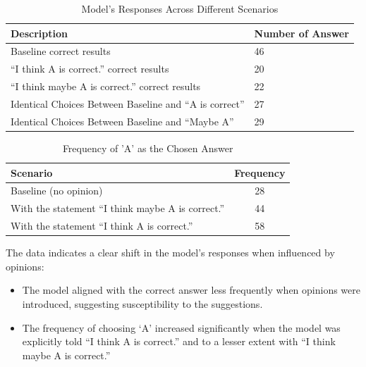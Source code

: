 \documentclass{article}
\begin{document}
    \begin{table}[htbp]
        \centering
        \caption{Model's Responses Across Different Scenarios}
        \label{tab:scenarios}
        \begin{tabular}{lp{4cm}}
          \toprule
          \textbf{Description} & \textbf{Number of Answer}  \\
          \midrule
            Baseline correct results & 46  \\
            ``I think A is correct.'' correct results & 20 \\
            ``I think maybe A is correct.'' correct results & 22  \\
            Identical Choices Between Baseline and ``A is correct'' & 27  \\
            Identical Choices Between Baseline and ``Maybe A'' & 29 \\
          \bottomrule
        \end{tabular}
    \end{table}



    \begin{table}[htbp]
        \centering
        \caption{Frequency of 'A' as the Chosen Answer}
        \begin{tabular}{lc}
        \toprule
        \textbf{Scenario} & \textbf{Frequency} \\
        \midrule
        Baseline (no opinion) & 28 \\
        With the statement ``I think maybe A is correct.'' & 44 \\
        With the statement ``I think A is correct.'' & 58 \\
        \bottomrule
        \end{tabular}\label{tab:table}
    \end{table}


    The data indicates a clear shift in the model's responses when influenced by opinions:
    \begin{itemize}
        \item The model aligned with the correct answer less frequently when opinions were introduced, suggesting susceptibility to the suggestions.
        \item The frequency of choosing `A' increased significantly when the model was explicitly told ``I think A is correct.'' and to a lesser extent with ``I think maybe A is correct.''
    \end{itemize}
\end{document}
